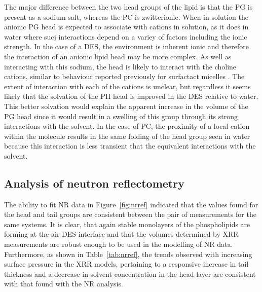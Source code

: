 The major difference between the two head groups of the lipid is that the PG is present as a sodium salt, whereas the PC is zwitterionic.
When in solution the anionic PG head is expected to associate with cations in solution, as it does in water \cite{grigoriev_effect_1999} where sucj interactions depend on a variey of factors including the ionic strength.
In the case of a DES, the environment is inherent ionic and therefore the interaction of an anionic lipid head may be more complex.
As well as interacting with this sodium, the head is likely to interact with the choline cations, similar to behaviour reported previously for surfactact micelles \cite{sanchez-fernandez_counterion_2018}.
The extent of interaction with each of the cations is unclear, but regardless it seems likely that the solvation of the PH head is improved in the DES relative to water.
This better solvation would explain the apparent increase in the volume of the PG head since it would result in a swelling of this group through its strong interactions with the solvent.
In the case of PC, the proximity of a local cation within the molecule results in the same folding of the head group seen in water because this interaction is less transient that the equivalent interactions with the solvent.

\subsection{Analysis of neutron reflectometry}
The ability to fit NR data in Figure~\ref{fig:nrref} indicated that the values found for the head and tail groups are consistent between the pair of measurements for the same systems.
It is clear, that again stable monolayers of the phospholipids are forming at the air-DES interface and that the volumes determined by XRR measurements are robust enough to be used in the modelling of NR data.
Furthermore, as shown in Table~\ref{tab:nrref}, the trends observed with increasing surface pressure in the XRR models, pertaining to a responsive increase in tail thickness and a decrease in solvent concentration in the head layer are consistent with that found with the NR analysis.

